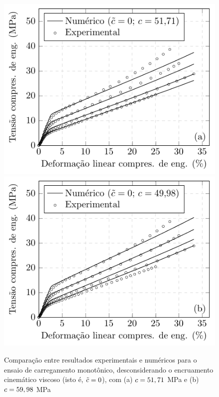 \documentclass[Tese.tex]{subfiles}
\begin{document}
{\begin{figure}[!htb]
	\centering
	\caption{Comparação entre resultados experimentais e numéricos para o ensaio de carregamento monotônico, desconsiderando o encruamento cinemático viscoso (isto é, $\tilde{c}=0$), com (a) $c = 51,71$ MPa e (b) $c = 59,98$ MPa}
	\label{fig:calibracao-PTFE-2}
	\includegraphics[scale=1.0]{Figuras/PTFE/khan-calibration-noViscousHardening1.pdf}\;\;\includegraphics[scale=1.0]{Figuras/PTFE/khan-calibration-noViscousHardening2.pdf}		
\end{figure}

}
\end{document}
